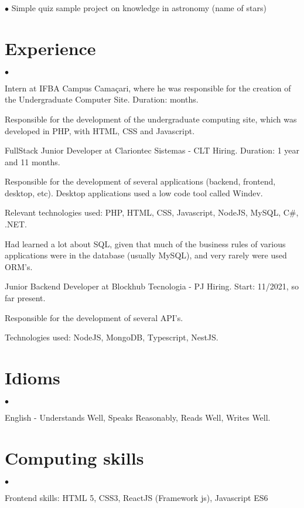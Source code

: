 \documentclass[margin,line]{res}
\newenvironment{list2}{
 \begin{list}{$\bullet$}{%
     \setlength{\itemsep}{0in}
     \setlength{\parsep}{0in} \setlength{\parskip}{0in}
     \setlength{\topsep}{0in} \setlength{\partopsep}{0in}
     \setlength{\leftmargin}{0.2in}}}{\end{list}}
\begin{document}
\begin{resume}
\begin{list2}
    Simple quiz sample project on knowledge in astronomy (name of stars)
\end{list2}
\vspace{0.2cm}
\section{Experience}
\begin{list2}
\item Intern at IFBA Campus Camaçari, where he was responsible for the creation of the Undergraduate Computer Site. Duration: months.

    Responsible for the development of the undergraduate computing site, which was developed in PHP, with HTML, CSS and Javascript.

\item FullStack Junior Developer at Clariontec Sistemas - CLT Hiring. Duration: 1 year and 11 months.

    Responsible for the development of several applications (backend, frontend, desktop, etc). Desktop applications used a low code tool called Windev.

    Relevant technologies used: PHP, HTML, CSS, Javascript, NodeJS, MySQL, C\#, .NET.

    Had learned a lot about SQL, given that much of the business rules of various applications were in the database (usually MySQL), and very rarely were used ORM's.

\item Junior Backend Developer at Blockhub Tecnologia - PJ Hiring. Start: 11/2021, so far present.

    Responsible for the development of several API's.

    Technologies used: NodeJS, MongoDB, Typescript, NestJS.
\end{list2}
\vspace{0.2cm}
\section{Idioms}
\begin{list2}
\item English - Understands Well, Speaks Reasonably, Reads Well, Writes Well.
\end{list2}
\vspace{0.2cm}
\section{Computing skills}
\begin{list2}
\item Frontend skills: HTML 5, CSS3, ReactJS (Framework js), Javascript ES6


\end{list2}
\end{resume}
\end{document}
